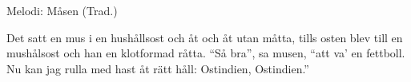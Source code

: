 \begin{song}

\begin{songmeta}
Melodi: Måsen (Trad.)
\end{songmeta}

\begin{songtext}
Det satt en mus i en hushållsost
och åt och åt utan måtta,
tills osten blev till en mushålsost
och han en klotformad råtta.
\textquotedblleft{}Så bra\textquotedblright{}, sa musen, \textquotedblleft{}att va' en fettboll.
Nu kan jag rulla med hast åt rätt håll:
Ostindien,
Ostindien.\textquotedblright{}
\end{songtext}

\end{song}
